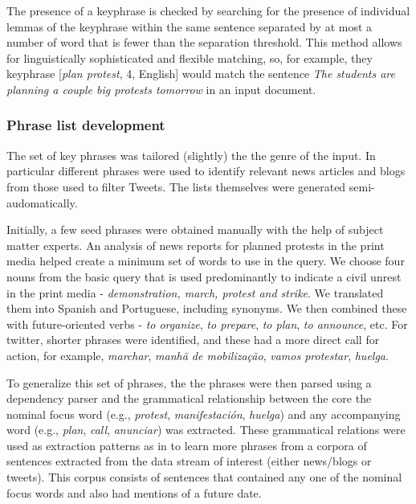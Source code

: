 The presence of a keyphrase is checked by searching for the presence of
individual lemmas of the keyphrase within the same sentence separated
by at most a number of word that is fewer than the separation threshold.  
This method allows for linguistically sophisticated and flexible matching, so, for example,
they keyphrase [{\em plan protest}, 4, English] would match the sentence
{\em The students are planning a couple big protests tomorrow} in an input document.


\subsubsection{Phrase list development}
\label{sec:phraselearning}

The set of key phrases was tailored (slightly) the the genre of the
input. In particular different phrases were used to identify relevant
news articles and blogs from those used to filter Tweets.  The lists
themselves were generated semi-audomatically.

Initially, a few seed phrases were obtained manually
with the help of subject matter experts.
An analysis of news reports for planned protests in the print media helped create a
minimum set of words to use in the query.  We choose four nouns from
the basic query that is used predominantly to indicate a civil unrest
in the print media - {\em demonstration, march, protest and
  strike}. We translated them into Spanish and Portuguese, including
synonyms.  We then combined these with future-oriented verbs - {\em to organize}, {\em to prepare}, {\em to
plan}, {\em to announce}, etc. For twitter, shorter phrases were identified, and these had
a more direct call for action, for example, {\em marchar}, {\em manhã de mobilização}, {\em
  vamos protestar}, {\em huelga}.

To generalize this set of phrases, the the phrases were then parsed
using a dependency parser \cite{freeling} and the grammatical
relationship between the core the nominal focus word (e.g., {\em
  protest}, {\em manifestación}, {\em huelga}) and any accompanying
word (e.g., {\em plan}, {\em call}, {\em anunciar}) was
extracted. These grammatical relations were used as extraction
patterns as in \cite{riloff2003learning} to learn more phrases from a
corpora of sentences extracted from the data stream of interest
(either news/blogs or tweets). This corpus consists of sentences that
contained any one of the nominal focus words and also had mentions of a
future date.

